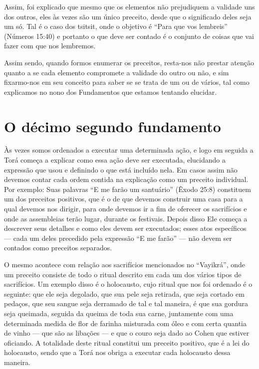 Assim, foi explicado que mesmo que os elementos não prejudiquem a
validade uns dos outros, eles às vezes são um único preceito, desde que
o significado deles seja um só. Tal é o caso dos tsitsit, onde o
objetivo é ``Para que vos lembreis'' (Números 15:40) e portanto o que
deve ser contado é o conjunto de coisas que vai fazer com que nos
lembremos.

Assim sendo, quando formos enumerar os preceitos, resta-nos não prestar
atenção quanto a se cada elemento compromete a validade do outro ou não,
e sim fixarmo-nos em seu conceito para saber se se trata de um ou de
vários, tal como explicamos no nono dos Fundamentos que estamos tentando
elucidar.



\chapter*{O décimo segundo fundamento}

Às vezes somos ordenados a executar uma determinada ação, e logo em
seguida a Torá começa a explicar como essa ação deve ser executada,
elucidando a expressão que usou e definindo o que está incluído nela. Em
casos assim não devemos contar cada ordem contida na explicação como um
preceito individual. Por exemplo: Suas palavras ``E me farão um
santuário'' (Êxodo 25:8) constituem um dos preceitos positivos, que é o
de que devemos construir uma casa para a qual devemos nos dirigir, para
onde devemos ir a fim de oferecer os sacrifícios e onde as assembleias
terão lugar, durante os festivais. Depois disso Ele começa a descrever
seus detalhes e como eles devem ser executados; esses atos específicos
--- cada um deles precedido pela expressão ``E me farão'' --- não devem
ser contados como preceitos separados.

O mesmo acontece com relação aos sacrifícios mencionados no
``Vayikrá'', onde um preceito consiste de todo o ritual descrito em
cada um dos vários tipos de sacrifícios. Um exemplo disso é o
holocausto, cujo ritual que nos foi ordenado é o seguinte: que ele seja
degolado, que sua pele seja retirada, que seja cortado em pedaços, que
seu sangue seja derramado de tal e tal maneira, é que sua gordura seja
queimada, seguida da queima de toda sua carne, juntamente com uma
determinada medida de flor de farinha misturada com óleo e com certa
quantia de vinho --- que são as libações --- e que o couro seja dado ao
Cohen que estiver oficiando. A totalidade deste ritual constitui um
preceito positivo, que é a lei do holocausto, sendo que a Torá nos
obriga a executar cada holocausto dessa maneira.

